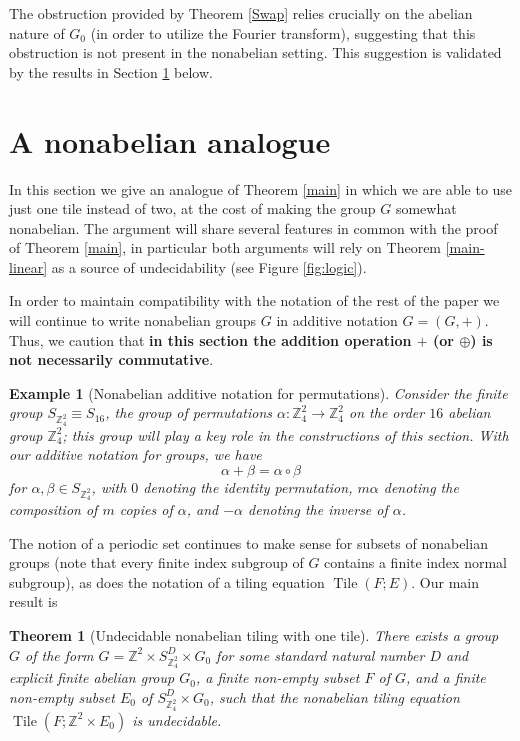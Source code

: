 \documentclass[reqno,a4paper,12pt]{amsart}
\numberwithin{equation}{section}
\numberwithin{figure}{section}
\def\Z{\mathbb{Z}}
\newcommand{\Tile}{\operatorname{Tile}}
\theoremstyle{plain}
\newtheorem{theorem}[thm]{Theorem}
\newtheorem{example}[thm]{Example}
\theoremstyle{definition}
\begin{document}
The obstruction provided by Theorem \ref{Swap} relies crucially on the abelian nature of $G_0$ (in order to utilize the Fourier transform), suggesting that this obstruction is not present in the nonabelian setting.  This suggestion is validated by the results in Section \ref{nonab-sec} below.

\section{A nonabelian analogue}\label{nonab-sec}

In this section we give an analogue of Theorem \ref{main} in which we are able to use just one tile instead of two, at the cost of making the group $G$ somewhat nonabelian.  The argument will share several features in common with the proof of Theorem \ref{main}, in particular both arguments will rely on Theorem \ref{main-linear} as a source of undecidability (see Figure \ref{fig:logic}).

In order to maintain compatibility with the notation of the rest of the paper we will continue to write nonabelian groups $G$ in additive notation $G = (G,+)$.  Thus, we caution that \textbf{in this section the addition operation $+$ (or $\oplus$) is not necessarily commutative}. 

\begin{example}[Nonabelian additive notation for permutations] Consider the finite group $S_{\Z_4^2} \equiv S_{16}$, the group of permutations $\alpha \colon \Z_4^2 \to \Z_4^2$ on the order $16$ abelian group $\Z_4^2$; this group will play a key role in the constructions of this section.  With our additive notation for groups, we have
$$ \alpha + \beta = \alpha \circ \beta$$
for $\alpha,\beta \in S_{\Z_4^2}$, with $0$ denoting the identity permutation,  $m\alpha$ denoting the composition of $m$ copies of $\alpha$, and $-\alpha$ denoting the inverse of $\alpha$.
\end{example}

The notion of a periodic set continues to make sense for subsets of nonabelian groups (note that every finite index subgroup of $G$ contains a finite index normal subgroup), as does the notation of a tiling equation $\Tile(F;E)$.  Our main result is

\begin{theorem}[Undecidable nonabelian tiling with one tile]\label{onetile}  There exists a group $G$ of the form $G = \Z^2 \times S_{\Z_4^2}^{D} \times G_0$ for some standard natural number $D$ and explicit finite abelian group $G_0$, a finite non-empty subset $F$ of $G$, and a finite non-empty subset $E_0$ of $S_{\Z_4^2}^{D} \times G_0$, such that the nonabelian tiling equation $\Tile(F;\Z^2 \times E_0)$ is undecidable.
\end{theorem}
\end{document}
